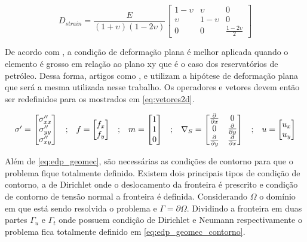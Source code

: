 \begin{equation} \label{eq:elasticplanestrain}
D_{strain} = \frac{E}{(1+\upsilon)(1-2\upsilon)}
\begin{bmatrix}
 1-\upsilon & \upsilon    &  0 \\
 \upsilon   &  1-\upsilon &  0 \\
 0& 0 & \frac{1-2\upsilon}{2}
\end{bmatrix}
\end{equation}

De acordo com \citet{jacob}, a condição de deformação plana é melhor aplicada quando o elemento é grosso em relação ao plano xy que é o caso dos reservatórios de petróleo.  Dessa forma, artigos como \cite{casteletto}, \cite{planeStrainProblems} e \cite{irina} utilizam a hipótese de deformação plana que será a mesma utilizada nesse trabalho. Os operadores e vetores devem então ser redefinidos para os mostrados em \eqref{eq:vetores2d}.

\begin{equation}
\label{eq:vetores2d}
\begin{matrix}
\sigma^\prime = \begin{bmatrix}
\sigma^{\prime\prime}_{xx}
\\
\sigma^{\prime\prime}_{yy}
\\
\sigma^{\prime\prime}_{xy}
\end{bmatrix}
&

;

&

f = \begin{bmatrix}
f_{x}
\\
f_{y}
\end{bmatrix}
&
;
&

m = \begin{bmatrix} 1 \\ 1 \\ 0\end{bmatrix}

&
;

&
\nabla_S = \begin{bmatrix} \frac{\partial { }}{\partial x} & 0 \\ 0 & \frac{\partial { }}{\partial y} \\ \frac{\partial { }}{\partial y} & \frac{\partial { }}{\partial x} \\ \end{bmatrix}

&
;

&

u = \begin{bmatrix}
u_x
\\
u_y
\end{bmatrix}

\end{matrix}
\end{equation}

Além de \eqref{eq:edp_geomec}, são necessárias as condições de contorno para que o problema fique totalmente definido. Existem dois principais tipos de condição de contorno, a de Dirichlet onde o deslocamento da fronteira é prescrito e condição de contorno de tensão normal a fronteira é definida. Considerando $\Omega$ o domínio em que está sendo resolvida o problema e $\Gamma = \partial \Omega$. Dividindo a fronteira em duas partes $\Gamma_u$ e $\Gamma_t$ onde possuem condição de Dirichlet e Neumann respectivamente o problema fica totalmente definido em \eqref{eq:edp_geomec_contorno}.


